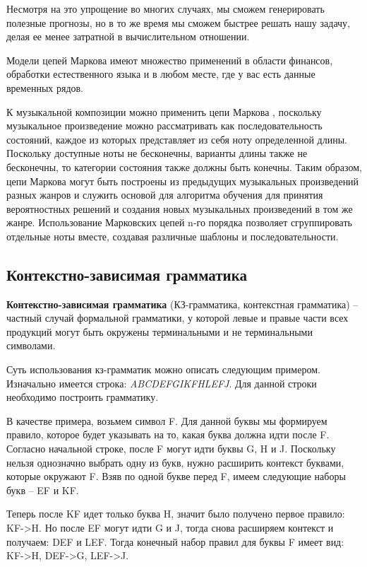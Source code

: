 Несмотря на это упрощение во многих случаях, мы сможем генерировать полезные прогнозы, но в то же время мы сможем быстрее решать нашу задачу, делая ее менее затратной в вычислительном отношении.

Модели цепей Маркова имеют множество применений в области финансов, обработки естественного языка и в любом месте, где у вас есть данные временных рядов.

К музыкальной композиции можно применить цепи Маркова \cite{prob-methods}, поскольку музыкальное произведение можно рассматривать как последовательность состояний, каждое из которых представляет из себя ноту определенной длины. Поскольку доступные ноты не бесконечны, варианты длины также не бесконечны, то категории состояния также должны быть конечны. Таким образом, цепи Маркова могут быть построены из предыдущих музыкальных произведений разных жанров и служить основой для алгоритма обучения для принятия вероятностных решений и создания новых музыкальных произведений в том же жанре. Использование Марковских цепей n-го порядка позволяет сгруппировать отдельные ноты вместе, создавая различные шаблоны и последовательности.

\subsection{Контекстно-зависимая грамматика}

\textbf{Контекстно-зависимая грамматика} (КЗ-грамматика, контекстная \linebreak  грамматика) \cite{kz-grammar} -- частный   случай формальной   грамматики, у которой  левые  и  правые  части  всех  продукций  могут  быть  окружены  терминальными  и не терминальными символами.

Суть использования кз-грамматик можно описать следующим примером. Изначально имеется строка: \textit{ABCDEFGIKFHLEFJ}. Для данной строки необходимо построить грамматику.

В качестве примера, возьмем символ F. Для данной буквы мы формируем правило, которое будет указывать на то, какая буква должна идти после F. Согласно начальной строке, после F могут идти буквы G, H и J. Поскольку нельзя однозначно выбрать одну из букв, нужно расширить контекст буквами, которые окружают F. Взяв по одной букве перед F, имеем следующие наборы букв -- EF и KF.

Теперь после KF идет только буква H, значит было получено первое правило: KF->H. Но после EF могут идти G и J, тогда снова расширяем контекст и получаем: DEF и LEF. Тогда конечный набор правил для буквы F имеет вид: KF->H, DEF->G, LEF->J.

